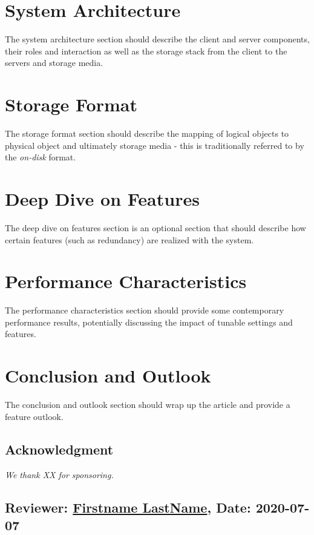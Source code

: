 \documentclass{jhps}
\begin{document}
\section{System Architecture} \label{sec:sys_arch}
The system architecture section should describe the client and server components, their roles and interaction as well as the storage stack from the client to the servers and storage media.

\section{Storage Format} \label{sec:sto_for}
The storage format section should describe the mapping of logical objects to physical object and ultimately storage media - this is traditionally referred to by the \textit{on-disk} format.

\section{Deep Dive on Features} \label{sec:deep_dive}
The deep dive on features section is an optional section that should describe how certain features (such as redundancy) are realized with the system.

\section{Performance Characteristics} \label{sec:per_char}
The performance characteristics section should provide some contemporary performance results, potentially discussing the impact of tunable settings and features.

\section{Conclusion and Outlook} \label{sec:con_out}
The conclusion and outlook section should wrap up the article and provide a feature outlook.

\subsection*{Acknowledgment} %
\textit{We thank XX for sponsoring.}



\reviews   %

\subsection*{Reviewer: \href{Optional URL to reviewer page}{Firstname LastName}, Date: 2020-07-07}
\end{document}
